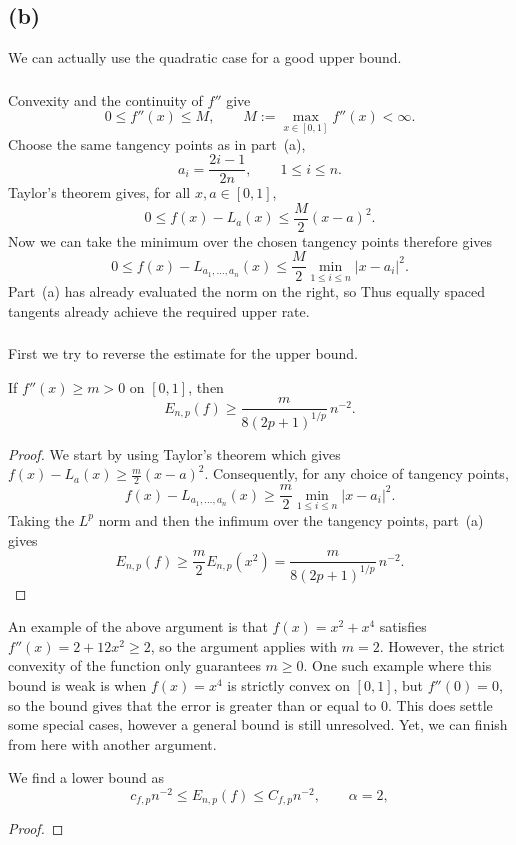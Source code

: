 \documentclass[11pt]{scrartcl}
\begin{document}
\subsection{(b)}

\begin{soln}
 We can actually 
use the quadratic case for a good upper bound.

\subsubsection*{}

Convexity and the continuity of $f''$ give
\[
0\le f''(x)\le M,
\qquad
M:=\max_{x\in[0,1]}f''(x)<\infty.
\]
Choose the same tangency points as in part~(a),
\[
a_i=\frac{2i-1}{2n},
\qquad 1\le i\le n.
\]
Taylor's theorem gives, for all $x,a\in[0,1]$,
\[
0\le f(x)-L_a(x)\le \frac M2(x-a)^2.
\]
Now we can take the minimum over the chosen tangency points therefore gives
\[
0\le f(x)-L_{a_1,\ldots,a_n}(x)
\le\frac{M}{2}\min_{1\le i\le n}|x-a_i|^2.
\]
Part~(a) has already evaluated the norm on the right, so
Thus equally spaced tangents already achieve the required upper rate.


\subsubsection*{}
First we try to reverse the estimate for the upper bound.
\begin{claim*}
    If $f''(x)\ge m>0$ on $[0,1]$, then
    \[
    E_{n,p}(f)\ge
    \frac{m}{8(2p+1)^{1/p}}\,n^{-2}.
    \]
\end{claim*}

\begin{proof}
    We start by using Taylor's theorem which gives
    $f(x)-L_a(x)\ge \frac m2(x-a)^2$.
    Consequently, for any choice of tangency points,
    \[
    f(x)-L_{a_1,\ldots,a_n}(x)
    \ge \frac m2\min_{1\le i\le n}|x-a_i|^2.
    \]
    Taking the $L^p$ norm and then the infimum over the tangency points,
    part~(a) gives
    \[
    E_{n,p}(f)\ge \frac m2 E_{n,p}(x^2)
    =\frac{m}{8(2p+1)^{1/p}}\,n^{-2}.
    \]
\end{proof}

An example of the above argument is that 
 $f(x)=x^2+x^4$ satisfies $f''(x)=2+12x^2\ge2$,
so the argument applies with $m=2$.
However, the strict convexity of the function only guarantees $m \geq 0$.
One such example 
where this bound is weak is when
$f(x)=x^4$ is strictly convex on $[0,1]$, but $f''(0)=0$, so the bound gives that the
error is greater than or equal to $0$. This does settle some special cases, however a general bound is 
still unresolved. Yet, we can finish from here with another argument. 
\begin{claim*}
    We find a lower bound as
    \[{
c_{f,p}n^{-2}\le E_{n,p}(f)\le C_{f,p}n^{-2},
\qquad \alpha=2,
}
\]
\end{claim*}
\begin{proof}
    


\end{proof}
\end{soln}
\end{document}
